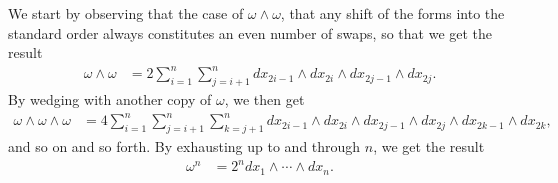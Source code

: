 \documentclass[10pt]{mypackage}
\begin{document}
\begin{solution}
  We start by observing that the case of $\omega\wedge\omega$, that any shift of the forms into the standard order always constitutes an even number of swaps, so that we get the result
  \begin{align*}
    \omega\wedge\omega &= 2\sum_{i=1}^{n}\sum_{j=i+1}^{n}dx_{2i-1}\wedge dx_{2i}\wedge dx_{2j-1}\wedge dx_{2j}.
  \end{align*}
  By wedging with another copy of $\omega$, we then get
  \begin{align*}
    \omega\wedge\omega\wedge\omega &= 4\sum_{i=1}^{n}\sum_{j=i+1}^{n}\sum_{k=j+1}^{n} dx_{2i-1}\wedge dx_{2i}\wedge dx_{2j-1}\wedge dx_{2j}\wedge dx_{2k-1}\wedge dx_{2k},
  \end{align*}
  and so on and so forth. By exhausting up to and through $n$, we get the result
  \begin{align*}
    \omega^{n} &= 2^{n} dx_1\wedge\cdots\wedge dx_n.
  \end{align*}
\end{solution}
\end{document}
